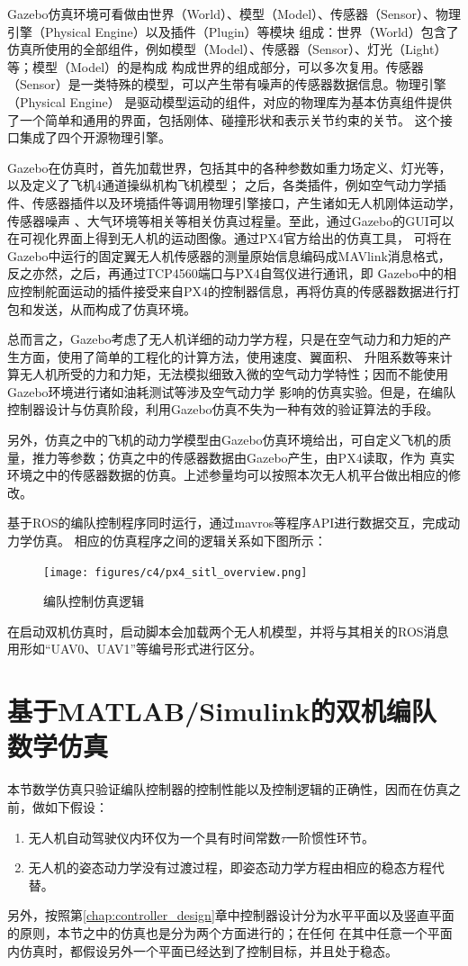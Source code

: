 Gazebo仿真环境可看做由世界（World）、模型（Model）、传感器（Sensor）、物理引擎（Physical Engine）以及插件（Plugin）等模块
组成：世界（World）包含了仿真所使用的全部组件，例如模型（Model）、传感器（Sensor）、灯光（Light）等；模型（Model）的是构成
构成世界的组成部分，可以多次复用。传感器（Sensor）是一类特殊的模型，可以产生带有噪声的传感器数据信息。物理引擎（Physical Engine）
是驱动模型运动的组件，对应的物理库为基本仿真组件提供了一个简单和通用的界面，包括刚体、碰撞形状和表示关节约束的关节。
这个接口集成了四个开源物理引擎。

Gazebo在仿真时，首先加载世界，包括其中的各种参数如重力场定义、灯光等，以及定义了飞机4通道操纵机构飞机模型；
之后，各类插件，例如空气动力学插件、传感器插件以及环境插件等调用物理引擎接口，产生诸如无人机刚体运动学，传感器噪声
、大气环境等相关等相关仿真过程量。至此，通过Gazebo的GUI可以在可视化界面上得到无人机的运动图像。通过PX4官方给出的仿真工具，
可将在Gazebo中运行的固定翼无人机传感器的测量原始信息编码成MAVlink消息格式，反之亦然，之后，再通过TCP4560端口与PX4自驾仪进行通讯，即
Gazebo中的相应控制舵面运动的插件接受来自PX4的控制器信息，再将仿真的传感器数据进行打包和发送，从而构成了仿真环境。

总而言之，Gazebo考虑了无人机详细的动力学方程，只是在空气动力和力矩的产生方面，使用了简单的工程化的计算方法，使用速度、翼面积、
升阻系数等来计算无人机所受的力和力矩，无法模拟细致入微的空气动力学特性；因而不能使用Gazebo环境进行诸如油耗测试等涉及空气动力学
影响的仿真实验。但是，在编队控制器设计与仿真阶段，利用Gazebo仿真不失为一种有效的验证算法的手段。

另外，仿真之中的飞机的动力学模型由Gazebo仿真环境给出，可自定义飞机的质量，推力等参数；仿真之中的传感器数据由Gazebo产生，由PX4读取，作为
真实环境之中的传感器数据的仿真。上述参量均可以按照本次无人机平台做出相应的修改。

基于ROS的编队控制程序同时运行，通过mavros等程序API进行数据交互，完成动力学仿真。
相应的仿真程序之间的逻辑关系如下图所示：
\begin{figure}[H]
    \centering
    \texttt{[image: figures/c4/px4\_sitl\_overview.png]}
    \caption{编队控制仿真逻辑}\label{fig:px4_sitl_overview}
\end{figure}
在启动双机仿真时，启动脚本会加载两个无人机模型，并将与其相关的ROS消息用形如“UAV0、UAV1”等编号形式进行区分。
\section{基于MATLAB/Simulink的双机编队数学仿真}
本节数学仿真只验证编队控制器的控制性能以及控制逻辑的正确性，因而在仿真之前，做如下假设：
\begin{enumerate}
\item 无人机自动驾驶仪内环仅为一个具有时间常数$\tau$一阶惯性环节。
\item 无人机的姿态动力学没有过渡过程，即姿态动力学方程由相应的稳态方程代替。
\end{enumerate}
另外，按照第\ref{chap:controller_design}章中控制器设计分为水平平面以及竖直平面的原则，本节之中的仿真也是分为两个方面进行的；在任何
在其中任意一个平面内仿真时，都假设另外一个平面已经达到了控制目标，并且处于稳态。

